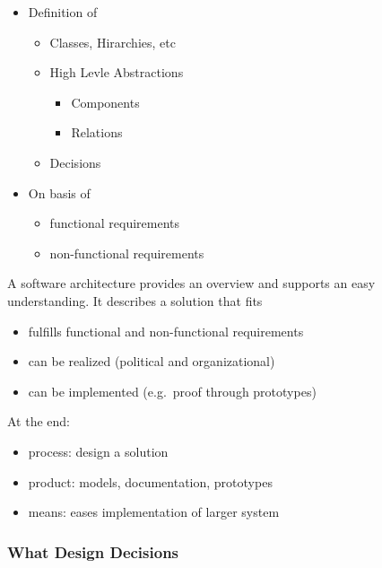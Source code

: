 \begin{itemize}
\tightlist
\item
  Definition of

  \begin{itemize}
  \tightlist
  \item
    Classes, Hirarchies, etc
  \item
    High Levle Abstractions

    \begin{itemize}
    \tightlist
    \item
      Components
    \item
      Relations
    \end{itemize}
  \item
    Decisions
  \end{itemize}
\item
  On basis of

  \begin{itemize}
  \tightlist
  \item
    functional requirements
  \item
    non-functional requirements
  \end{itemize}
\end{itemize}

A software architecture provides an overview and supports an easy
understanding. It describes a solution that fits

\begin{itemize}
\tightlist
\item
  fulfills functional and non-functional requirements
\item
  can be realized (political and organizational)
\item
  can be implemented (e.g.~proof through prototypes)
\end{itemize}

At the end:

\begin{itemize}
\tightlist
\item
  process: design a solution
\item
  product: models, documentation, prototypes
\item
  means: eases implementation of larger system
\end{itemize}

\hypertarget{what-design-decisions}{%
\subsubsection{What Design Decisions}\label{what-design-decisions}}

